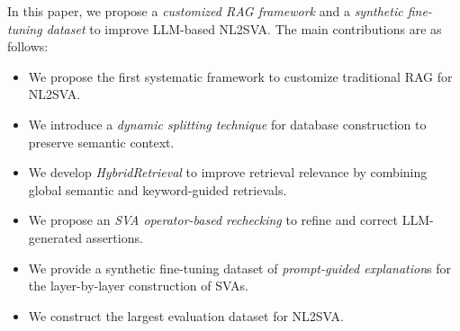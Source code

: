 
In this paper, we propose a \textit{customized RAG framework} and a \textit{synthetic fine-tuning dataset} to improve LLM-based NL2SVA. 
The main contributions are as follows:
\begin{itemize}
    \item [(1)] We propose the first systematic framework to customize traditional RAG for NL2SVA.
    \item [(2)] We introduce a \textit{dynamic splitting technique} for database construction to preserve semantic context.
    \item [(3)] We develop \textit{HybridRetrieval} to improve retrieval relevance by combining global semantic and keyword-guided retrievals.
    \item [(4)] We propose an \textit{SVA operator-based rechecking} to refine and correct LLM-generated assertions.
    \item [(5)] We provide a synthetic fine-tuning dataset of \textit{prompt-guided explanation}s for the layer-by-layer construction of SVAs.
    \item [(6)] We construct the largest evaluation dataset for NL2SVA.
\end{itemize}


